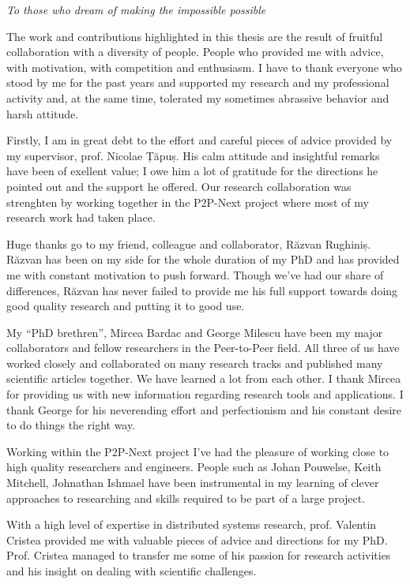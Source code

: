 \vspace*{7cm}
\begin{center}
\textit{To those who dream of making the impossible possible}
\end{center}

\newpage

The work and contributions highlighted in this thesis are the result of
fruitful collaboration with a diversity of people. People who provided me
with advice, with motivation, with competition and enthusiasm. I have to thank
everyone who stood by me for the past years and supported my research and my
professional activity and, at the same time, tolerated my sometimes abrassive
behavior and harsh attitude.

Firstly, I am in great debt to the effort and careful pieces of advice
provided by my supervisor, prof. Nicolae Țăpuș. His calm attitude and
insightful remarks have been of exellent value; I owe him a lot of gratitude
for the directions he pointed out and the support he offered. Our
research collaboration was strenghten by working together in the P2P-Next
project where most of my research work had taken place.

Huge thanks go to my friend, colleague and collaborator, Răzvan Rughiniș.
Răzvan has been on my side for the whole duration of my PhD and has provided
me with constant motivation to push forward. Though we've had our share of
differences, Răzvan has never failed to provide me his full support towards
doing good quality research and putting it to good use.

My ``PhD brethren'', Mircea Bardac and George Milescu have been my major
collaborators and fellow researchers in the Peer-to-Peer field. All three of
us have worked closely and collaborated on many research tracks and published
many scientific articles together. We have learned a lot from each other. I
thank Mircea for providing us with new information regarding research tools
and applications. I thank George for his neverending effort and perfectionism
and his constant desire to do things the right way.

Working within the P2P-Next project I've had the pleasure of working close to
high quality researchers and engineers. People such as Johan Pouwelse, Keith
Mitchell, Johnathan Ishmael have been instrumental in my learning of clever
approaches to researching and skills required to be part of a large project.

With a high level of expertise in distributed systems research, prof. Valentin
Cristea provided me with valuable pieces of advice and directions for my PhD.
Prof. Cristea managed to transfer me some of his passion for research
activities and his insight on dealing with scientific challenges.

